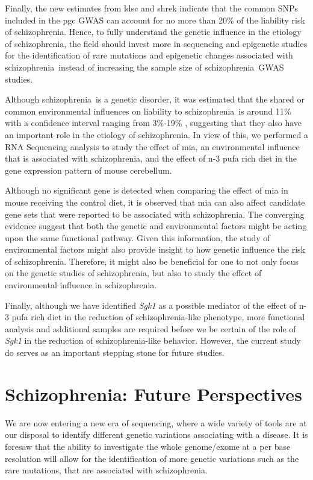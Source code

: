 \documentclass[12pt]{scrbook}
\newcommand*{\scz}{schizophrenia}
\begin{document}
Finally, the new estimates from \gls{ldsc} and \gls{shrek} indicate that the common \glspl{SNP} included in the \gls{pgc} \gls{GWAS} can account for no more than 20\% of the liability risk of \scz.
Hence, to fully understand the genetic influence in the etiology of \scz, the field should invest more in sequencing and epigenetic studies for the identification of rare mutations and epigenetic changes associated with \scz\ instead of increasing the sample size of \scz\ \gls{GWAS} studies. 

Although \scz\ is a genetic disorder, it was estimated that the shared or common environmental influences on liability to \scz\ is around 11\% with a confidence interval ranging from 3\%-19\%  \citep{sullivan2003schizophrenia}, suggesting that they also have an important role in the etiology of \scz.
In view of this, we performed a RNA Sequencing analysis to study the effect of \gls{mia}, an environmental influence that is associated with \scz, and the effect of n-3 \gls{pufa} rich diet in the gene expression pattern of mouse cerebellum.

Although no significant gene is detected when comparing the effect of \gls{mia} in mouse receiving the control diet, it is observed that \gls{mia} can also affect candidate gene sets that were reported to be associated with \scz.
The converging evidence suggest that both the genetic and environmental factors might be acting upon the same functional pathway.
Given this information, the study of environmental factors might also provide insight to how genetic influence the risk of \scz. 
Therefore, it might also be beneficial for one to not only focus on the genetic studies of \scz, but also to study the effect of environmental influence in \scz.

Finally, although we have identified \textit{Sgk1} as a possible mediator of the effect of n-3 \gls{pufa} rich diet in the reduction of \scz-like phenotype, more functional analysis and additional samples are required before we be certain of the role of \textit{Sgk1} in the reduction of \scz-like behavior.
However, the current study do serves as an important stepping stone for future studies. 

\section{Schizophrenia: Future Perspectives}
We are now entering a new era of sequencing, where a wide variety of tools are at our disposal to identify different genetic variations associating with a disease. 
It is foresaw that the ability to investigate the whole genome/exome at a per base resolution will allow for the identification of more genetic variations such as the rare mutations, that are associated with \scz.
	
\end{document}
